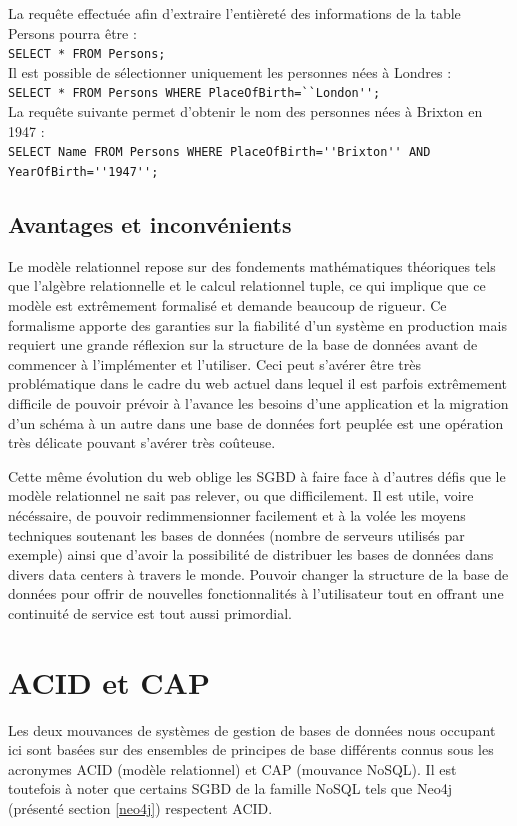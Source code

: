 \documentclass[11pt]{article}
\begin{document}
La requête effectuée afin d'extraire l'entièreté des informations de la table Persons pourra être : \\
\verb|SELECT * FROM Persons;| \\
Il est possible de sélectionner uniquement les personnes nées à Londres : \\
\verb|SELECT * FROM Persons WHERE PlaceOfBirth=``London'';| \\
La requête suivante permet d'obtenir le nom des personnes nées à Brixton en 1947 : \\
\verb|SELECT Name FROM Persons WHERE PlaceOfBirth=''Brixton'' AND YearOfBirth=''1947'';|
\subsection{Avantages et inconvénients}
Le modèle relationnel repose sur des fondements mathématiques théoriques tels que l'algèbre relationnelle et le calcul relationnel tuple, ce qui implique que ce modèle est extrêmement formalisé et demande beaucoup de rigueur. Ce formalisme apporte des garanties sur la fiabilité d'un système en production mais requiert une grande réflexion sur la structure de la base de données avant de commencer à l'implémenter et l'utiliser. Ceci peut s'avérer être très problématique dans le cadre du web actuel dans lequel il est parfois extrêmement difficile de pouvoir prévoir à l'avance les besoins d'une application et la migration d'un schéma à un autre dans une base de données fort peuplée est une opération très délicate pouvant s'avérer très coûteuse.

Cette même évolution du web oblige les SGBD à faire face à d'autres défis que le modèle relationnel ne sait pas relever, ou que difficilement. Il est utile, voire nécéssaire, de pouvoir redimmensionner facilement et à la volée les moyens techniques soutenant les bases de données (nombre de serveurs utilisés par exemple) ainsi que d'avoir la possibilité de distribuer les bases de données dans divers data centers à travers le monde. Pouvoir changer la structure de la base de données pour offrir de nouvelles fonctionnalités à l'utilisateur tout en offrant une continuité de service est tout aussi primordial.

\section{ACID et CAP}
Les deux mouvances de systèmes de gestion de bases de données nous occupant ici sont basées sur des ensembles de principes de base différents connus sous les acronymes ACID (modèle relationnel) et CAP (mouvance NoSQL). Il est toutefois à noter que certains SGBD de la famille NoSQL tels que Neo4j (présenté section \ref{neo4j}) respectent ACID.
\end{document}
